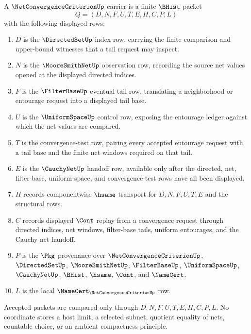 \begin{definition}
\label{def:net-convergence-criterion-carrier}
A $\NetConvergenceCriterionUp$ carrier is a finite $\BHist$ packet
$$
Q=(D,N,F,U,T,E,H,C,P,L)
$$
with the following displayed rows:
\begin{enumerate}
\item $D$ is the $\DirectedSetUp$ index row, carrying the finite comparison and upper-bound witnesses that a tail request may inspect.
\item $N$ is the $\MooreSmithNetUp$ observation row, recording the source net values opened at the displayed directed indices.
\item $F$ is the $\FilterBaseUp$ eventual-tail row, translating a neighborhood or entourage request into a displayed tail base.
\item $U$ is the $\UniformSpaceUp$ control row, exposing the entourage ledger against which the net values are compared.
\item $T$ is the convergence-test row, pairing every accepted entourage request with a tail base and the finite net windows required on that tail.
\item $E$ is the $\CauchyNetUp$ handoff row, available only after the directed, net, filter-base, uniform-space, and convergence-test rows have all been displayed.
\item $H$ records componentwise $\hsame$ transport for $D,N,F,U,T,E$ and the structural rows.
\item $C$ records displayed $\Cont$ replay from a convergence request through directed indices, net windows, filter-base tails, uniform entourages, and the Cauchy-net handoff.
\item $P$ is the $\Pkg$ provenance over $\NetConvergenceCriterionUp$, $\DirectedSetUp$, $\MooreSmithNetUp$, $\FilterBaseUp$, $\UniformSpaceUp$, $\CauchyNetUp$, $\BHist$, $\hsame$, $\Cont$, and $\NameCert$.
\item $L$ is the local $\NameCert_{\NetConvergenceCriterionUp}$ row.
\end{enumerate}
Accepted packets are compared only through $D,N,F,U,T,E,H,C,P,L$. No coordinate stores a host limit, a selected subnet, quotient equality of nets, countable choice, or an ambient compactness principle.
\end{definition}

